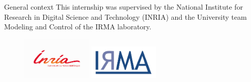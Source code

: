 \begin{frame}{General context}
    This internship was supervised by the National Institute for  Research in Digital Science and Technology (INRIA) and the University team Modeling and Control of the IRMA laboratory. 
    \begin{figure}
        \centering
        \includegraphics[width=0.3\textwidth]{images/inria.png}
        \includegraphics[width=0.3\textwidth]{images/logo_irma.png}
    \end{figure}

\end{frame}